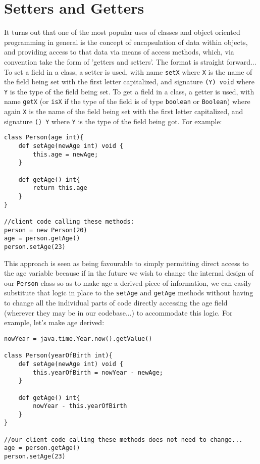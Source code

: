 \documentclass[conc-doc]{subfiles}
\begin{document}
\section{Setters and Getters}
\label{sec:setandget}
It turns out that one of the most popular uses of classes and object oriented programming in general is the concept of encapsulation of data within objects, and providing access to that data via means of access methods, which, via convention take the form of 'getters and setters'. The format is straight forward... To set a field in a class, a setter is used, with name \lstinline{setX} where \lstinline{X} is the name of the field being set with the first letter capitalized, and signature \lstinline{(Y) void} where \lstinline{Y} is the type of the field being set. To get a field in a class, a getter is used, with name \lstinline{getX} (or \lstinline{isX} if the type of the field is of type \lstinline{boolean} or \lstinline{Boolean}) where again \lstinline{X} is the name of the field being set with the first letter capitalized, and signature \lstinline{() Y} where \lstinline{Y} is the type of the field being got. For example:

\begin{lstlisting}
class Person(age int){
	def setAge(newAge int) void {
		this.age = newAge;
	}
	
	def getAge() int{
		return this.age
	}
}

//client code calling these methods:
person = new Person(20)
age = person.getAge()
person.setAge(23)
\end{lstlisting}

This approach is seen as being favourable to simply permitting direct access to the age variable because if in the future we wish to change the internal design of our \lstinline{Person} class so as to make age a derived piece of information, we can easily substitute that logic in place to the \lstinline{setAge} and \lstinline{getAge} methods without having to change all the individual parts of code directly accessing the age field (wherever they may be in our codebase...) to accommodate this logic. For example, let's make age derived:

\begin{lstlisting}
nowYear = java.time.Year.now().getValue()

class Person(yearOfBirth int){
	def setAge(newAge int) void {
		this.yearOfBirth = nowYear - newAge;
	}
	
	def getAge() int{
		nowYear - this.yearOfBirth
	}
}

//our client code calling these methods does not need to change...
age = person.getAge()
person.setAge(23)
\end{lstlisting}
\end{document}

